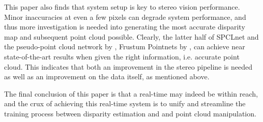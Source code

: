 This paper also finds that system setup is key to stereo vision performance. Minor inaccuracies at even a few pixels can degrade system performance, and thus more investigation is needed into generating the most accurate disparity map and subsequent point cloud possible. Clearly, the latter half of SPCLnet and the pseudo-point cloud network by \cite{wang_pseudo-lidar_2019}, Frustum Pointnets by \cite{qi_frustum_2017}, can achieve near state-of-the-art results when given the right information, i.e. accurate point cloud. This indicates that both an improvement in the stereo pipeline is needed as well as an improvement on the data itself, as mentioned above.

The final conclusion of this paper is that a real-time may indeed be within reach, and the crux of achieving this real-time system is to unify and streamline the training process between disparity estimation and and point cloud manipulation. 






